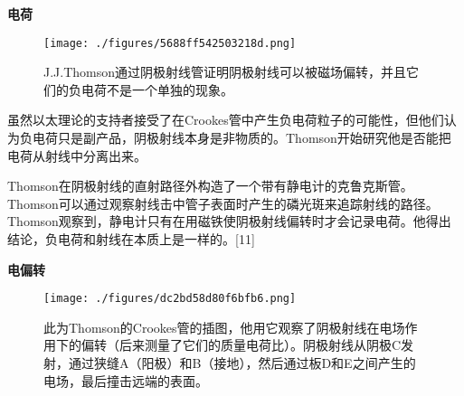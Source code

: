 \textbf{电荷}

\begin{figure}[ht]
\centering
\texttt{[image: ./figures/5688ff542503218d.png]}
\caption{J.J.Thomson通过阴极射线管证明阴极射线可以被磁场偏转，并且它们的负电荷不是一个单独的现象。} \label{fig_Joseph_2}
\end{figure}
虽然以太理论的支持者接受了在Crookes管中产生负电荷粒子的可能性，但他们认为负电荷只是副产品，阴极射线本身是非物质的。Thomson开始研究他是否能把电荷从射线中分离出来。

Thomson在阴极射线的直射路径外构造了一个带有静电计的克鲁克斯管。Thomson可以通过观察射线击中管子表面时产生的磷光斑来追踪射线的路径。Thomson观察到，静电计只有在用磁铁使阴极射线偏转时才会记录电荷。他得出结论，负电荷和射线在本质上是一样的。[11]

\textbf{电偏转}

\begin{figure}[ht]
\centering
\texttt{[image: ./figures/dc2bd58d80f6bfb6.png]}
\caption{此为Thomson的Crookes管的插图，他用它观察了阴极射线在电场作用下的偏转（后来测量了它们的质量电荷比）。阴极射线从阴极C发射，通过狭缝A（阳极）和B（接地），然后通过板D和E之间产生的电场，最后撞击远端的表面。} \label{fig_Joseph_3}
\end{figure}
